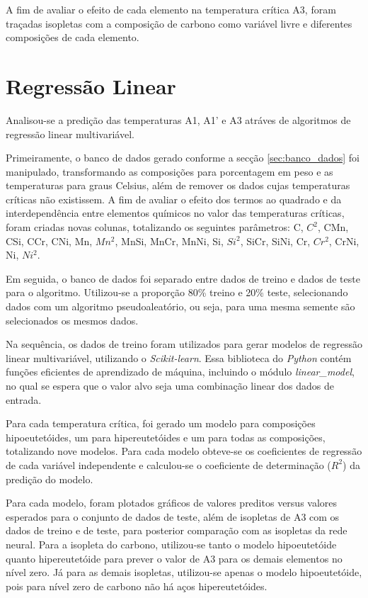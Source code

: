 \documentclass[brazil,tf,epusp]{usp}  %
\begin{document}
A fim de avaliar o efeito de cada elemento na temperatura crítica A3, foram traçadas isopletas com a composição de carbono como variável livre e diferentes composições de cada elemento.

\section{Regressão Linear}
\label{sec:metodo_RL}

Analisou-se a predição das temperaturas A1, A1' e A3 atráves de algoritmos de regressão linear multivariável.

Primeiramente, o banco de dados gerado conforme a secção \ref{sec:banco_dados} foi manipulado, transformando as composições para porcentagem em peso e as temperaturas para graus Celsius, além de remover os dados cujas temperaturas críticas não existissem. A fim de avaliar o efeito dos termos ao quadrado e da interdependência entre elementos químicos no valor das temperaturas críticas, foram criadas novas colunas, totalizando os seguintes parâmetros: C, $C^{2}$, CMn, CSi, CCr, CNi, Mn, $Mn^{2}$, MnSi, MnCr, MnNi, Si, $Si^{2}$, SiCr, SiNi, Cr, $Cr^{2}$, CrNi, Ni, $Ni^{2}$.

Em seguida, o banco de dados foi separado entre dados de treino e dados de teste para o algoritmo. Utilizou-se a proporção 80\% treino e 20\% teste, selecionando dados com um algoritmo pseudoaleatório, ou seja, para uma mesma semente são selecionados os mesmos dados.

Na sequência, os dados de treino foram utilizados para gerar modelos de regressão linear multivariável, utilizando o \textit{Scikit-learn}. Essa biblioteca do \textit{Python} contém funções eficientes de aprendizado de máquina, incluindo o módulo \textit{linear\_model}, no qual se espera que o valor alvo seja uma combinação linear dos dados de entrada.

Para cada temperatura crítica, foi gerado um modelo para composições hipoeutetóides, um para hipereutetóides e um para todas as composições, totalizando nove modelos. Para cada modelo obteve-se os coeficientes de regressão de cada variável independente e calculou-se o coeficiente de determinação ($R^{2}$) da predição do modelo.

Para cada modelo, foram plotados gráficos de valores preditos versus valores esperados para o conjunto de dados de teste, além de isopletas de A3 com os dados de treino e de teste, para posterior comparação com as isopletas da rede neural. Para a isopleta do carbono, utilizou-se tanto o modelo hipoeutetóide quanto hipereutetóide para prever o valor de A3 para os demais elementos no nível zero. Já para as demais isopletas, utilizou-se apenas o modelo hipoeutetóide, pois para nível zero de carbono não há aços hipereutetóides.
\end{document}
